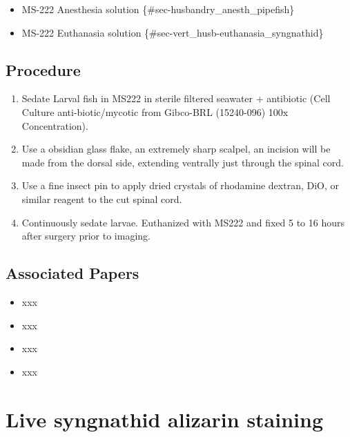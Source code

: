 \documentclass[
  letterpaper,
  DIV=11,
  numbers=noendperiod]{scrreprt}
\providecommand{\tightlist}{%
  \setlength{\itemsep}{0pt}\setlength{\parskip}{0pt}}\usepackage{longtable,booktabs,array}
\begin{document}
\begin{itemize}
\tightlist
\item
  MS-222 Anesthesia solution \{\#sec-husbandry\_anesth\_pipefish\}
\item
  MS-222 Euthanasia solution \{\#sec-vert\_husb-euthanasia\_syngnathid\}
\end{itemize}

\hypertarget{procedure-79}{%
\section{Procedure}\label{procedure-79}}

\begin{enumerate}
\def\labelenumi{\arabic{enumi}.}
\tightlist
\item
  Sedate Larval fish in MS222 in sterile filtered seawater + antibiotic
  (Cell Culture anti-biotic/mycotic from Gibco-BRL (15240-096) 100x
  Concentration).
\item
  Use a obsidian glass flake, an extremely sharp scalpel, an incision
  will be made from the dorsal side, extending ventrally just through
  the spinal cord.
\item
  Use a fine insect pin to apply dried crystals of rhodamine dextran,
  DiO, or similar reagent to the cut spinal cord.
\item
  Continuously sedate larvae. Euthanized with MS222 and fixed 5 to 16
  hours after surgery prior to imaging.
\end{enumerate}

\hypertarget{associated-papers-54}{%
\section{Associated Papers}\label{associated-papers-54}}

\begin{itemize}
\tightlist
\item
  xxx
\item
  xxx
\item
  xxx
\item
  xxx
\end{itemize}

\hypertarget{sec-vert_exp-live_alizarin_syngnathid}{%
\chapter{Live syngnathid alizarin
staining}\label{sec-vert_exp-live_alizarin_syngnathid}}
\end{document}
